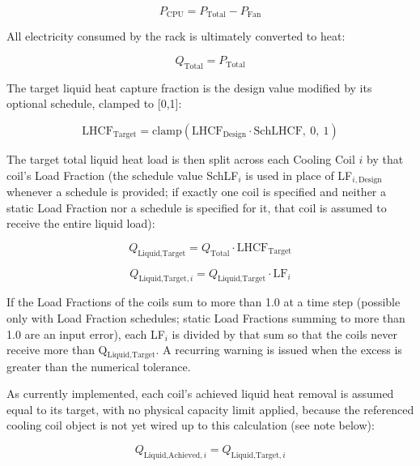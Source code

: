 \begin{equation}
P_{\textrm{CPU}} = P_{\textrm{Total}} - P_{\textrm{Fan}}
\end{equation}

All electricity consumed by the rack is ultimately converted to heat:

\begin{equation}
Q_{\textrm{Total}} = P_{\textrm{Total}}
\end{equation}

The target liquid heat capture fraction is the design value modified by its optional schedule, clamped to {[}0,1{]}:

\begin{equation}
\textrm{LHCF}_{\textrm{Target}} = \textrm{clamp}\left(\textrm{LHCF}_{\textrm{Design}} \cdot \textrm{SchLHCF},\ 0,\ 1\right)
\end{equation}

The target total liquid heat load is then split across each Cooling Coil $i$ by that coil's Load Fraction (the schedule value SchLF$_i$ is used in place of LF$_{i,\textrm{Design}}$ whenever a schedule is provided; if exactly one coil is specified and neither a static Load Fraction nor a schedule is specified for it, that coil is assumed to receive the entire liquid load):

\begin{equation}
Q_{\textrm{Liquid,Target}} = Q_{\textrm{Total}} \cdot \textrm{LHCF}_{\textrm{Target}}
\end{equation}

\begin{equation}
Q_{\textrm{Liquid,Target},i} = Q_{\textrm{Liquid,Target}} \cdot \textrm{LF}_i
\end{equation}

If the Load Fractions of the coils sum to more than 1.0 at a time step (possible only with Load Fraction schedules; static Load Fractions summing to more than 1.0 are an input error), each LF$_i$ is divided by that sum so that the coils never receive more than Q$_{\textrm{Liquid,Target}}$. A recurring warning is issued when the excess is greater than the numerical tolerance.

As currently implemented, each coil's achieved liquid heat removal is assumed equal to its target, with no physical capacity limit applied, because the referenced cooling coil object is not yet wired up to this calculation (see note below):

\begin{equation}
Q_{\textrm{Liquid,Achieved},i} = Q_{\textrm{Liquid,Target},i}
\end{equation}

